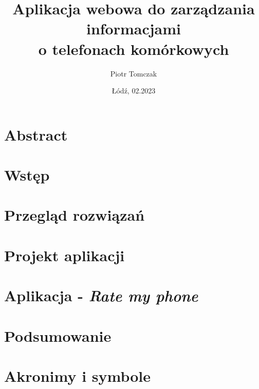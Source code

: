 \documentclass[a4paper,12pt,twoside]{extreport}
\title{Aplikacja webowa do zarządzania informacjami \\ o telefonach komórkowych}
\author{Piotr Tomczak}
\date{\L{}\'od\'z, 02.2023}
\begin{document}


\thispagestyle{plain}

\chapter*{Abstract}


% 

\tableofcontents
{}

\chapter{Wstęp}


\chapter{Przegląd rozwiązań}


\chapter{Projekt aplikacji}


\chapter{Aplikacja - \textit{Rate my phone}}


\chapter{Podsumowanie}


\printbibliography[heading=bibintoc, title=Bibliografia]

\newpage
\listoffigures

\newpage
\listofcodes

\newpage
\listoftables

\appendix
\chapter{Akronimy i symbole}

\end{document}
